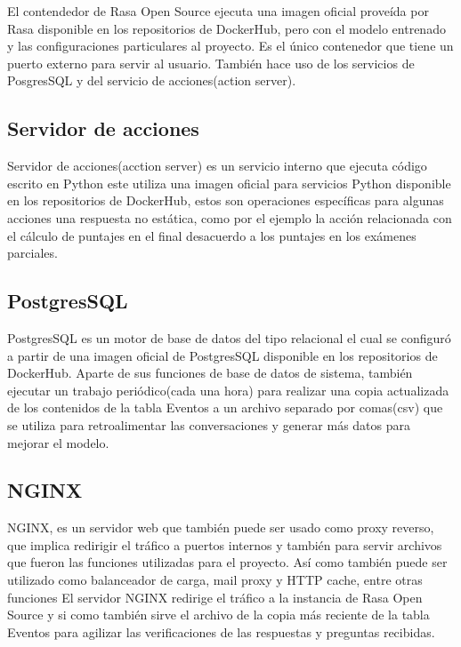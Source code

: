 El contendedor de Rasa Open Source ejecuta una imagen oficial proveída por Rasa disponible en los repositorios de DockerHub\cite{DockerHub}, pero con el modelo entrenado y las configuraciones particulares al proyecto. Es el único contenedor que tiene un puerto externo para servir al usuario. También hace uso de los servicios de PosgresSQL y del servicio de acciones(action server). 


\subsection{Servidor de acciones}

Servidor de acciones(acction server) es un servicio interno que ejecuta código escrito en Python este utiliza una imagen oficial para servicios Python disponible en los repositorios de DockerHub\cite{DockerHub}, estos son operaciones específicas para algunas acciones una respuesta no estática, como por el ejemplo la acción relacionada con el cálculo de puntajes en el final desacuerdo a los puntajes en los exámenes parciales.

 \subsection{PostgresSQL}
  
 PostgresSQL es un motor de base de datos del tipo relacional\cite{postgresql} el cual se configuró a partir de una imagen oficial de PostgresSQL disponible en los repositorios de DockerHub\cite{DockerHub}. Aparte de sus funciones de base de datos de sistema, también ejecutar un trabajo periódico(cada una hora) para realizar una copia actualizada de los contenidos de la tabla Eventos a un archivo separado por comas(csv) que se utiliza para retroalimentar las conversaciones y generar más datos para mejorar el modelo. 

 \subsection{NGINX}

 NGINX, es un servidor web que también puede ser usado como proxy reverso, que implica redirigir el tráfico a puertos internos y también para servir archivos que fueron las funciones utilizadas para el proyecto. Así como también puede ser utilizado como balanceador de carga, mail proxy y HTTP cache, entre otras funciones \cite{NGINX}
El servidor NGINX redirige el tráfico a la instancia de Rasa Open Source y si como también sirve el archivo de 
la copia más reciente de la tabla Eventos para agilizar las verificaciones de las respuestas y preguntas recibidas.

